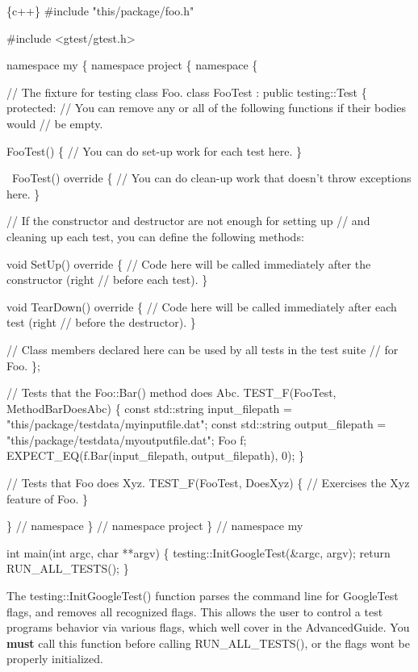 \begin{DoxyCode}
\{c++\}
#include "this/package/foo.h"

#include <gtest/gtest.h>

namespace my \{
namespace project \{
namespace \{

// The fixture for testing class Foo.
class FooTest : public testing::Test \{
 protected:
  // You can remove any or all of the following functions if their bodies would
  // be empty.

  FooTest() \{
     // You can do set-up work for each test here.
  \}

  ~FooTest() override \{
     // You can do clean-up work that doesn't throw exceptions here.
  \}

  // If the constructor and destructor are not enough for setting up
  // and cleaning up each test, you can define the following methods:

  void SetUp() override \{
     // Code here will be called immediately after the constructor (right
     // before each test).
  \}

  void TearDown() override \{
     // Code here will be called immediately after each test (right
     // before the destructor).
  \}

  // Class members declared here can be used by all tests in the test suite
  // for Foo.
\};

// Tests that the Foo::Bar() method does Abc.
TEST\_F(FooTest, MethodBarDoesAbc) \{
  const std::string input\_filepath = "this/package/testdata/myinputfile.dat";
  const std::string output\_filepath = "this/package/testdata/myoutputfile.dat";
  Foo f;
  EXPECT\_EQ(f.Bar(input\_filepath, output\_filepath), 0);
\}

// Tests that Foo does Xyz.
TEST\_F(FooTest, DoesXyz) \{
  // Exercises the Xyz feature of Foo.
\}

\}  // namespace
\}  // namespace project
\}  // namespace my

int main(int argc, char **argv) \{
  testing::InitGoogleTest(&argc, argv);
  return RUN\_ALL\_TESTS();
\}
\end{DoxyCode}


The {\ttfamily testing\+::\+Init\+Google\+Test()} function parses the command line for Google\+Test flags, and removes all recognized flags. This allows the user to control a test program\textquotesingle{}s behavior via various flags, which we\textquotesingle{}ll cover in the Advanced\+Guide. You {\bfseries must} call this function before calling {\ttfamily R\+U\+N\+\_\+\+A\+L\+L\+\_\+\+T\+E\+S\+T\+S()}, or the flags won\textquotesingle{}t be properly initialized.

